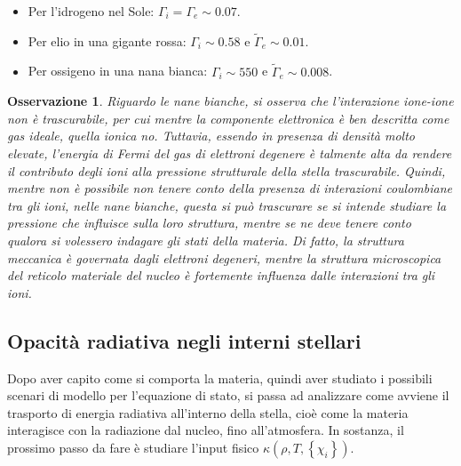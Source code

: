 \documentclass[11pt, a4paper]{scrartcl}
\theoremstyle{style}
\newtheorem{osservazione}{Osservazione}[section]
\theoremstyle{style1}
\numberwithin{equation}{subsection}
\begin{document}
\begin{itemize}
	\item Per l'idrogeno nel Sole: $\Gamma_i = \Gamma_e \sim 0.07$.
	\item Per elio in una gigante rossa: $\Gamma_i \sim 0.58$ e $\widetilde{\Gamma}_e \sim 0.01$.
	\item Per ossigeno in una nana bianca: $\Gamma_i \sim 550$ e $\widetilde{\Gamma}_e \sim 0.008$.
\end{itemize}
\begin{osservazione}
Riguardo le nane bianche, si osserva che l'interazione ione-ione non \`e trascurabile, per cui mentre la componente elettronica \`e ben descritta come gas ideale, quella ionica no. 
Tuttavia, essendo in presenza di densit\`a molto elevate, l'energia di Fermi del gas di elettroni degenere \`e talmente alta da rendere il contributo degli ioni alla pressione strutturale della stella trascurabile.
Quindi, mentre non \`e possibile non tenere conto della presenza di interazioni coulombiane tra gli ioni, nelle nane bianche, questa si pu\`o trascurare se si intende studiare la pressione che influisce sulla loro struttura, mentre se ne deve tenere conto qualora si volessero indagare gli stati della materia.
Di fatto, la struttura meccanica \`e governata dagli elettroni degeneri, mentre la struttura microscopica del reticolo materiale del nucleo \`e fortemente influenza dalle interazioni tra gli ioni.
\end{osservazione}

\subsection{Opacit\`a radiativa negli interni stellari}

Dopo aver capito come si comporta la materia, quindi aver studiato i possibili scenari di modello per l'equazione di stato, si passa ad analizzare come avviene il trasporto di energia radiativa all'interno della stella, cio\`e come la materia interagisce con la radiazione dal nucleo, fino all'atmosfera. 
In sostanza, il prossimo passo da fare \`e studiare l'input fisico $\kappa (\rho ,T , \left\{ \chi _i \right\} )$.
\end{document}
